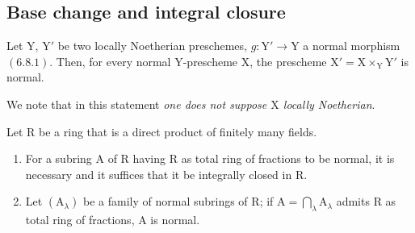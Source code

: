 \subsection{Base change and integral closure}
\label{subsection:IV.6.14}

\begin{proposition}[6.14.1]
\label{IV.6.14.1}
Let $\mathrm{Y}$, $\mathrm{Y}'$ be two locally Noetherian preschemes, $g:\mathrm{Y}'\to\mathrm{Y}$
a normal morphism $(6.8.1)$. Then, for every normal $\mathrm{Y}$-prescheme $\mathrm{X}$, the prescheme $\mathrm{X}'=\mathrm{X}\times_\mathrm{Y}\mathrm{Y}'$
is normal.
\end{proposition}

We note that in this statement \emph{one does not suppose $\mathrm{X}$ locally Noetherian}.

\begin{lemma}[6.14.1.1]
\label{IV.6.14.1.1}
Let $\mathrm{R}$ be a ring that is a direct product of finitely many fields.
\begin{enumerate}[label=\textup{(\roman*)}]
  \item For a subring $\mathrm{A}$ of $\mathrm{R}$ having $\mathrm{R}$ as total ring of fractions to be normal,
it is necessary and it suffices that it be integrally closed in $\mathrm{R}$.
  \item Let $(\mathrm{A}_\lambda)$ be a family of normal subrings of $\mathrm{R}$; if $\mathrm{A}=\bigcap_\lambda\mathrm{A}_\lambda$ admits $\mathrm{R}$ as
total ring of fractions, $\mathrm{A}$ is normal.
\end{enumerate}
\end{lemma}

